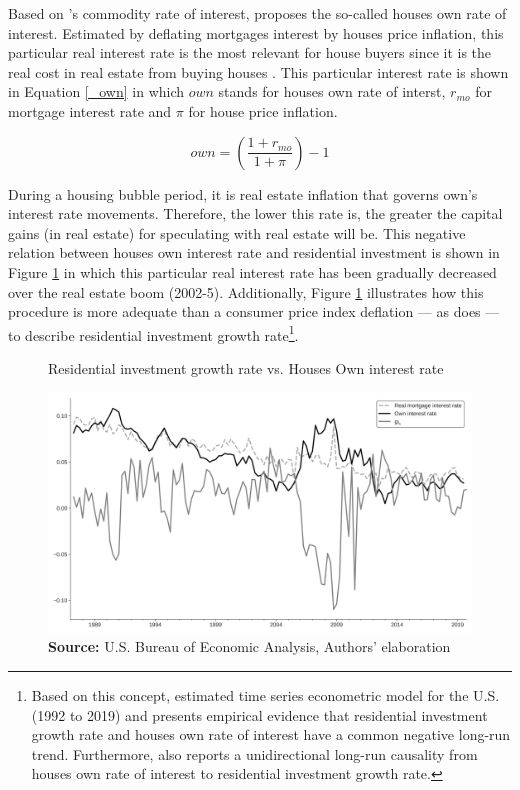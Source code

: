 \documentclass[12pt]{article}
\begin{document}
Based on \citeauthor*{Sraffa_Own_1932}'s \citeyear{Sraffa_Own_1932} commodity rate of interest, \textcite{teixeira_crescimento_2015} proposes the so-called houses own rate of interest.
Estimated by deflating mortgages interest by houses price inflation, this particular real interest rate is the most relevant for house buyers since it is the real cost in real estate from buying houses  \cite[p.~53]{teixeira_crescimento_2015}.
This particular interest rate is shown in Equation \ref{_own} in which \(own\) stands for houses own rate of interst, \(r_{mo}\) for mortgage interest rate and \(\pi\) for house price inflation.


\begin{equation}
\label{_own}
own = \left(\frac{1+r_{mo}}{1+\pi}\right) -1
\end{equation}

During a housing bubble period, it is real estate inflation that governs own's interest rate movements. Therefore, the lower this rate is, the greater the capital gains (in real estate) for speculating with real estate will be. This negative relation between houses own interest rate and residential investment is shown in Figure \ref{propria_investo} in which this particular real interest rate has been gradually decreased over the real estate boom (2002-5).
Additionally, Figure \ref{propria_investo} illustrates how this  procedure is more adequate than a consumer price index deflation --- as \textcite[p.~143--6]{fair_macroeconometric_2013} does --- to describe residential investment growth rate\footnote{Based on this concept, \textcite{petrini_demanda_2019} estimated time series econometric model for the U.S. (1992 to 2019) and presents empirical evidence that residential investment growth rate and houses own rate of interest have a common negative long-run trend.  Furthermore, \textcite{petrini_demanda_2019} also reports a unidirectional long-run causality from houses own rate of interest to residential investment growth rate.}.


\begin{figure}[htb]
	\centering
	\caption{Residential investment growth rate vs. Houses Own interest rate}
	\label{propria_investo}
	\includegraphics[width=.8\textwidth]{./figs/Own_gI}
	\caption*{\textbf{Source:} U.S. Bureau of Economic Analysis, Authors' elaboration}
\end{figure}
\end{document}
